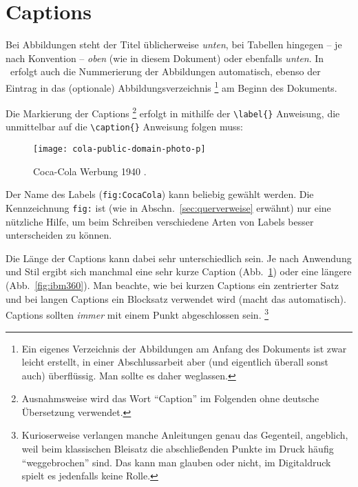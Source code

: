 \section{Captions}

Bei Abbildungen steht der Titel üblicherweise \emph{unten}, bei
Tabellen hingegen -- je nach Konvention -- \emph{oben} (wie in diesem Dokument) 
oder ebenfalls \emph{unten}. In \latex\ erfolgt
auch die Nummerierung der Abbildungen automatisch, ebenso der
Eintrag in das (optionale)
Abbildungsverzeichnis%
\footnote{Ein eigenes Verzeichnis der Abbildungen am Anfang des Dokuments
ist zwar leicht erstellt, in einer Abschlussarbeit aber (und eigentlich
überall sonst auch) überflüssig. Man sollte es daher weglassen.}
am Beginn des Dokuments.

Die Markierung der Captions%
\footnote{Ausnahmsweise wird das Wort "`Caption"' im Folgenden
ohne deutsche Übersetzung verwendet.} erfolgt in \latex mithilfe
der \verb!\label{}! Anweisung, die unmittelbar auf die
\verb!\caption{}! Anweisung folgen muss:
%
\begin{LaTeXCode}[numbers=none]
\begin{figure}
\centering
\texttt{[image: cola-public-domain-photo-p]}
\caption{Coca-Cola Werbung 1940 \cite{CocaCola1940}.}
\label{fig:CocaCola}
\end{figure}
\end{LaTeXCode}
%
Der Name des Labels (\texttt{fig:CocaCola}) kann beliebig gewählt werden. 
Die Kennzeichnung \texttt{fig:} ist (wie in Abschn.\ \ref{sec:querverweise} 
erwähnt) nur eine nützliche Hilfe, um beim Schreiben verschiedene Arten 
von Labels besser unterscheiden zu können.

Die Länge der Captions kann dabei sehr unterschiedlich sein. Je
nach Anwendung und Stil ergibt sich manchmal eine sehr kurze
Caption (Abb.~\ref{fig:CocaCola}) oder eine längere
(Abb.~\ref{fig:ibm360}).
Man beachte, wie bei kurzen Captions ein
zentrierter Satz und bei langen Captions ein Blocksatz verwendet
wird (\latex macht das automatisch).
Captions sollten \emph{immer} mit einem Punkt abgeschlossen sein.%
\footnote{Kurioserweise verlangen manche Anleitungen
genau das Gegenteil, angeblich, weil beim klassischen Bleisatz 
die abschließenden Punkte im Druck häufig "`weggebrochen"' sind. 
Das kann man glauben oder nicht, im Digitaldruck 
spielt es jedenfalls keine Rolle.}

